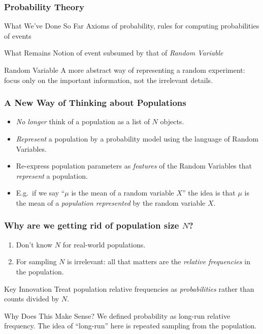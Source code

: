 \begin{frame}
\frametitle{Probability Theory}


\begin{block}{What We've Done So Far}
Axioms of probability, rules for computing probabilities of events
\end{block}

\begin{block}{What Remains}
Notion of event subsumed by that of \emph{\alert{Random Variable}}
\end{block}
\begin{block}{Random Variable}
	A more abstract way of representing a random experiment: focus only on the important information, not the irrelevant details.
\end{block}


\end{frame}
\begin{frame}
\frametitle{A New Way of Thinking about Populations}

\begin{itemize}
	\item \emph{No longer} think of a population as a list of $N$ objects.
	\item \emph{Represent} a population by a \alert{probability model} using the language of Random Variables.
	\item Re-express population parameters as \emph{features} of the Random Variables that \emph{represent} a population.
	\item E.g.\ if we say ``$\mu$ is the mean of a random variable $X$'' the idea is that $\mu$ is the mean of a \alert{\emph{population represented}} by the random variable $X$.
\end{itemize}


\end{frame}
\begin{frame}
\frametitle{Why are we getting rid of population size $N$?}

 
\begin{enumerate}
	\item Don't know $N$ for real-world populations. 
	\item For sampling $N$ is irrelevant: all that matters are the \alert{\emph{relative frequencies}} in the population. 
\end{enumerate}

\begin{block}{Key Innovation}
Treat population relative frequencies as \emph{probabilities} rather than counts divided by $N$.
\end{block}
 
\begin{block}{Why Does This Make Sense?}
We defined probability as long-run relative frequency. The idea of ``long-run'' here is repeated sampling from the population.
\end{block}

\end{frame}
